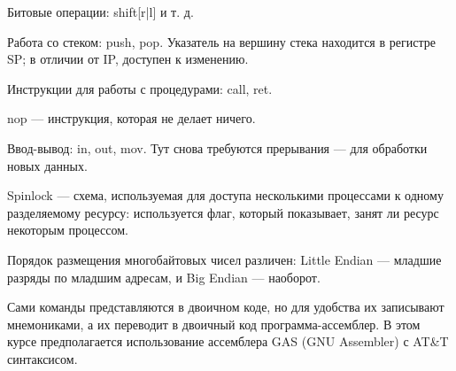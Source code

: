\documentclass[main]{subfiles}
\begin{document}
Битовые операции: shift[r|l] и т. д.

Работа со стеком: push, pop. Указатель на вершину стека находится в
регистре SP; в отличии от IP, доступен к изменению.

Инструкции для работы с процедурами: call, ret.

nop --- инструкция, которая не делает ничего.

Ввод-вывод: in, out, mov. Тут снова требуются прерывания --- для
обработки новых данных.

Spinlock --- схема, используемая для доступа несколькими процессами
к одному разделяемому ресурсу: используется флаг, который показывает,
занят ли ресурс некоторым процессом.

Порядок размещения многобайтовых чисел различен:
Little Endian --- младшие разряды по младшим адресам,
и Big Endian --- наоборот.

Сами команды представляются в двоичном коде, но для удобства
их записывают мнемониками, а их переводит в двоичный код
программа-ассемблер. В этом курсе предполагается использование
ассемблера GAS (GNU Assembler) с AT\&T синтаксисом.
\end{document}
